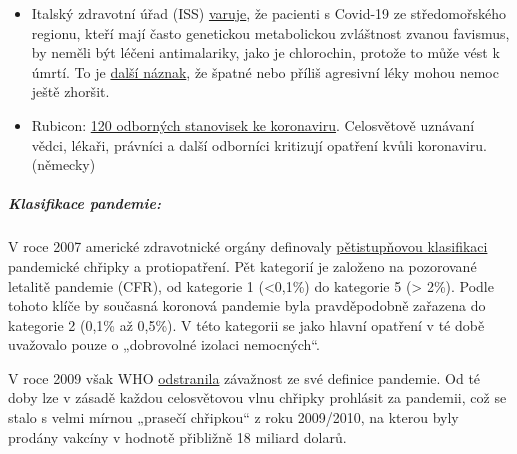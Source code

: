 \begin{itemize}
{  v nemocnici, ale doma}. To rozhodně vysvětluje
  \href{https://swprs.files.wordpress.com/2020/04/intensivbettenbelegung-schweiz-2020-04-14.png}{převážně
  prázdné} švýcarské nemocnice a jednotky intenzivní péče. Je také již
  známo, že přibližně 50\% všech dalších úmrtí se vyskytuje
  \href{https://www.nzz.ch/zuerich/coronavirus-zuerich-aendert-nun-das-testregime-in-heimenauch-viele-aeltere-covid-19-infizierte-entwickeln-keine-symptome-zuerich-aendert-nun-das-testregime-in-heimen-ld.1552089}{v
  domovech s pečovatelskou službou}. Dr. Kucher má podezření, že někteří
  z těchto lidí umírají na náhlou plicní embolii. To je myslitelné.
  Vyvstává však otázka, jakou roli hraje „izolace`` v těchto nedávných
  úmrtích.
\item
  Italský zdravotní úřad (ISS)
  \href{https://www.iss.it/en/rapporti-covid-19/-/asset_publisher/btw1J82wtYzH/content/id/5334891}{varuje},
  že pacienti s Covid-19 ze středomořského regionu, kteří mají často
  genetickou metabolickou zvláštnost zvanou favismus, by neměli být
  léčeni antimalariky, jako je chlorochin, protože to může vést k úmrtí.
  To je
  \href{https://www.sciencedaily.com/releases/2020/02/200206110703.htm}{další
  náznak}, že špatné nebo příliš agresivní léky mohou nemoc ještě
  zhoršit.
\item
  Rubicon:
  \href{https://www.rubikon.news/artikel/120-expertenstimmen-zu-corona}{120
  odborných stanovisek ke koronaviru}. Celosvětově uznávaní vědci,
  lékaři, právníci a další odborníci kritizují opatření kvůli
  koronaviru. (německy)
\end{itemize}

\hypertarget{klasifikace-pandemie}{%
\subparagraph{\texorpdfstring{\textbf{Klasifikace
pandemie:}}{Klasifikace pandemie:}}\label{klasifikace-pandemie}}

V roce 2007 americké zdravotnické orgány definovaly
\href{https://www.cidrap.umn.edu/news-perspective/2007/02/hhs-ties-pandemic-mitigation-advice-severity}{pětistupňovou
klasifikaci} pandemické chřipky a protiopatření. Pět kategorií je
založeno na pozorované letalitě pandemie (CFR), od kategorie 1
(\textless{}0,1\%) do kategorie 5 (\textgreater{} 2\%). Podle tohoto
klíče by současná koronová pandemie byla pravděpodobně zařazena do
kategorie 2 (0,1\% až 0,5\%). V této kategorii se jako hlavní opatření v
té době uvažovalo pouze o „dobrovolné izolaci nemocných``.

 V roce 2009 však WHO
\href{https://www.forbes.com/2010/02/05/world-health-organization-swine-flu-pandemic-opinions-contributors-michael-fumento.html\#5ae32fb848e8}{odstranila}
závažnost ze své definice pandemie. Od té doby lze v zásadě každou
celosvětovou vlnu chřipky prohlásit za pandemii, což se stalo s velmi
mírnou „prasečí chřipkou`` z roku 2009/2010, na kterou byly prodány
vakcíny v hodnotě přibližně 18 miliard dolarů.

